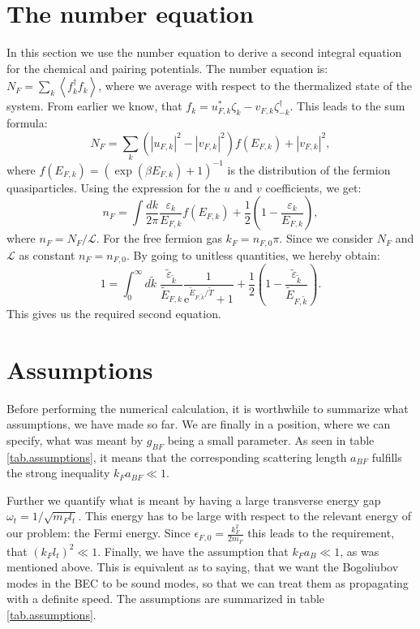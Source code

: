 \section{The number equation} \label{sec.chemicalpotential.numberequation}
In this section we use the number equation to derive a second integral equation for the chemical and pairing potentials. The number equation is: $N_F = \sum_k \left \langle f_k^\dagger f_k \right \rangle$, where we average with respect to the thermalized state of the system. From earlier we know, that $f_k = u_{F,k}^* \zeta_k -v_{F,k} \zeta_{-k}^\dagger$. This leads to the sum formula:
\begin{equation}
N_F = \sum_k \left(|u_{F,k}|^2-|v_{F,k}|^2\right) f(E_{F,k}) + |v_{F,k}|^2,\nonumber
\end{equation}
where $f(E_{F,k}) = (\exp(\beta E_{F,k}) + 1)^{-1}$ is the distribution of the fermion quasiparticles. Using the expression for the $u$ and $v$ coefficients, we get:
\begin{equation}
n_F = \int \frac{dk}{2\pi} \frac{\varepsilon_k}{E_{F,k}}f(E_{F,k}) + \frac{1}{2}\left(1 - \frac{\varepsilon_k}{E_{F,k}}\right), \nonumber
\end{equation}
where $n_F = N_F/\mathcal{L}$. For the free fermion gas $k_F = n_{F,0}\pi$. Since we consider $N_F$ and $\mathcal{L}$ as constant $n_F = n_{F,0}$. By going to unitless quantities, we hereby obtain:
\begin{equation}
1 = \int_0^\infty d\tilde{k} \; \frac{\tilde{\varepsilon}_{\tilde{k}}}{\tilde{E}_{F,k}}\frac{1}{\text{e}^{ \tilde{E}_{F,\tilde{k}}/\tilde{T} } + 1 } + \frac{1}{2}\left(1 - \frac{\tilde{\varepsilon}_{\tilde{k}}}{\tilde{E}_{F,\tilde{k}}}\right). 
\label{eq.NumberEquationUnitless}
\end{equation}
This gives us the required second equation.

\section{Assumptions}
Before performing the numerical calculation, it is worthwhile to summarize what assumptions, we have made so far. We are finally in a position, where we can specify, what was meant by $g_{BF}$ being a small parameter. As seen in table \ref{tab.assumptions}, it means that the corresponding scattering length $a_{BF}$ fulfills the strong inequality $k_F a_{BF} \ll 1$. 

Further we quantify what is meant by having a large transverse energy gap $\omega_t = 1/\sqrt{m_Fl_t}$. This energy has to be large with respect to the relevant energy of our problem: the Fermi energy. Since $\epsilon_{F,0} = \frac{k_F^2}{2m_F}$ this leads to the requirement, that $(k_Fl_t)^2\ll 1$. Finally, we have the assumption that $k_Fa_B \ll 1$, as was mentioned above. This is equivalent as to saying, that we want the Bogoliubov modes in the BEC to be sound modes, so that we can treat them as propagating with a definite speed. The assumptions are summarized in table \ref{tab.assumptions}.

